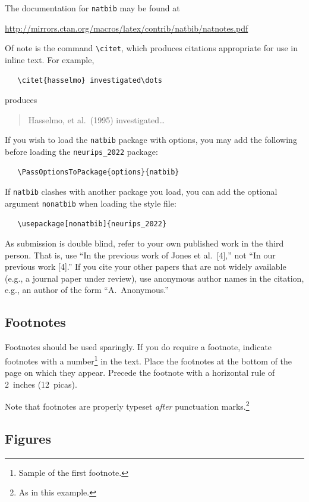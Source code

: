 \documentclass{article}
\begin{document}
The documentation for \verb+natbib+ may be found at
\begin{center}
  \url{http://mirrors.ctan.org/macros/latex/contrib/natbib/natnotes.pdf}
\end{center}
Of note is the command \verb+\citet+, which produces citations appropriate for
use in inline text.  For example,
\begin{verbatim}
   \citet{hasselmo} investigated\dots
\end{verbatim}
produces
\begin{quote}
  Hasselmo, et al.\ (1995) investigated\dots
\end{quote}


If you wish to load the \verb+natbib+ package with options, you may add the
following before loading the \verb+neurips_2022+ package:
\begin{verbatim}
   \PassOptionsToPackage{options}{natbib}
\end{verbatim}


If \verb+natbib+ clashes with another package you load, you can add the optional
argument \verb+nonatbib+ when loading the style file:
\begin{verbatim}
   \usepackage[nonatbib]{neurips_2022}
\end{verbatim}


As submission is double blind, refer to your own published work in the third
person. That is, use ``In the previous work of Jones et al.\ [4],'' not ``In our
previous work [4].'' If you cite your other papers that are not widely available
(e.g., a journal paper under review), use anonymous author names in the
citation, e.g., an author of the form ``A.\ Anonymous.''


\subsection{Footnotes}


Footnotes should be used sparingly.  If you do require a footnote, indicate
footnotes with a number\footnote{Sample of the first footnote.} in the
text. Place the footnotes at the bottom of the page on which they appear.
Precede the footnote with a horizontal rule of 2~inches (12~picas).


Note that footnotes are properly typeset \emph{after} punctuation
marks.\footnote{As in this example.}


\subsection{Figures}
\end{document}
